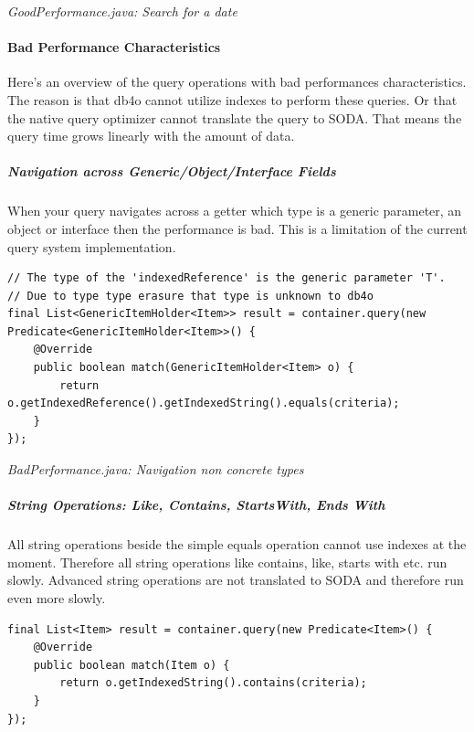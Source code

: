{\small\itshape GoodPerformance.java: Search for a date\par}
\medskip

\paragraph{Bad Performance Characteristics}
\label{ref:basics-querying-native-queries-nq-performance-characteristics:badperf}

Here's an overview of the query operations with bad performances characteristics. The reason is that db4o cannot utilize indexes to perform these queries. Or that the native query optimizer cannot translate the query to SODA. That means the query time grows linearly with the amount of data.

\subparagraph*{Navigation across Generic/Object/Interface Fields}

When your query navigates across a getter which type is a generic parameter, an object or interface then the performance is bad. This is a limitation of the current query system implementation.

\begin{lstlisting}
// The type of the 'indexedReference' is the generic parameter 'T'.
// Due to type type erasure that type is unknown to db4o
final List<GenericItemHolder<Item>> result = container.query(new Predicate<GenericItemHolder<Item>>() {
    @Override
    public boolean match(GenericItemHolder<Item> o) {
        return o.getIndexedReference().getIndexedString().equals(criteria);
    }
});
\end{lstlisting}

{\small\itshape BadPerformance.java: Navigation non concrete types\par}
\medskip

\subparagraph*{String Operations: Like, Contains, StartsWith, Ends With}

All string operations beside the simple equals operation cannot use indexes at the moment. Therefore all string operations like contains, like, starts with etc. run slowly. Advanced string operations are not translated to SODA and therefore run even more slowly.

\begin{lstlisting}
final List<Item> result = container.query(new Predicate<Item>() {
    @Override
    public boolean match(Item o) {
        return o.getIndexedString().contains(criteria);
    }
});
\end{lstlisting}

